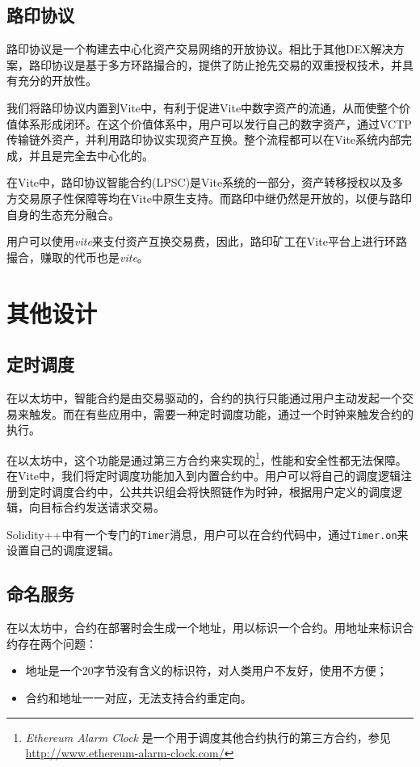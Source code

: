 \documentclass[UTF8,nofonts]{ctexart}
\begin{document}
\begin{multicols}{2}
\subsection{路印协议}
路印协议\cite{loopring}是一个构建去中心化资产交易网络的开放协议。相比于其他DEX解决方案，路印协议是基于多方环路撮合的，提供了防止抢先交易的双重授权技术，并具有充分的开放性。

我们将路印协议内置到Vite中，有利于促进Vite中数字资产的流通，从而使整个价值体系形成闭环。在这个价值体系中，用户可以发行自己的数字资产，通过VCTP传输链外资产，并利用路印协议实现资产互换。整个流程都可以在Vite系统内部完成，并且是完全去中心化的。

在Vite中，路印协议智能合约(LPSC)是Vite系统的一部分，资产转移授权以及多方交易原子性保障等均在Vite中原生支持。而路印中继仍然是开放的，以便与路印自身的生态充分融合。

用户可以使用\textit{vite}来支付资产互换交易费，因此，路印矿工在Vite平台上进行环路撮合，赚取的代币也是\textit{vite}。

\section{其他设计}
\subsection{定时调度}
在以太坊中，智能合约是由交易驱动的，合约的执行只能通过用户主动发起一个交易来触发。而在有些应用中，需要一种定时调度功能，通过一个时钟来触发合约的执行。

在以太坊中，这个功能是通过第三方合约来实现的\footnote{\textit{Ethereum Alarm Clock} 是一个用于调度其他合约执行的第三方合约，参见 \url{http://www.ethereum-alarm-clock.com/}}，性能和安全性都无法保障。在Vite中，我们将定时调度功能加入到内置合约中。用户可以将自己的调度逻辑注册到定时调度合约中，公共共识组会将快照链作为时钟，根据用户定义的调度逻辑，向目标合约发送请求交易。

Solidity++中有一个专门的\texttt{Timer}消息，用户可以在合约代码中，通过\texttt{Timer.on}来设置自己的调度逻辑。

\subsection{命名服务}\label{sec:vns}
在以太坊中，合约在部署时会生成一个地址，用以标识一个合约。用地址来标识合约存在两个问题：
\begin{itemize}
	\item 地址是一个20字节没有含义的标识符，对人类用户不友好，使用不方便；
	\item 合约和地址一一对应，无法支持合约重定向。
\end{itemize}


\end{multicols}
\end{document}
